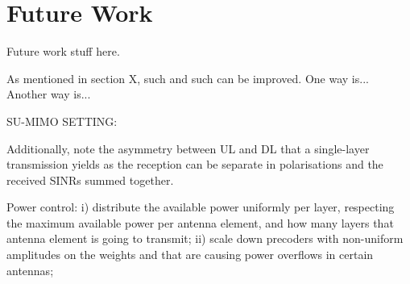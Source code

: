 \section{Future Work}
\label{sec:future-work}

Future work stuff here.


As mentioned in section X, such and such can be improved. One way is... Another way is... 



SU-MIMO SETTING:

Additionally, note the asymmetry between UL and DL that a single-layer transmission yields as the reception can be separate in polarisations and the received SINRs summed together.


Power control: i) distribute the available power uniformly per layer, respecting the maximum available power per antenna element, and how many layers that antenna element is going to transmit; ii) scale down precoders with non-uniform amplitudes on the weights and that are causing power overflows in certain antennas; 


